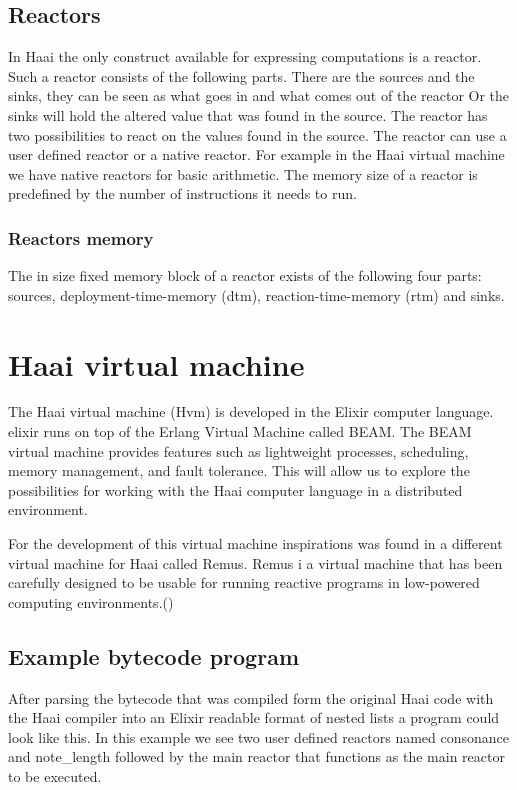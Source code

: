\documentclass[a4paper]{book}
\begin{document}
\section{Reactors}
In Haai the only construct available for expressing computations is a reactor. Such a reactor consists of the following parts. There are the sources and the sinks, they can be seen as what goes in and what comes out of the reactor Or the sinks will hold the altered value that was found in the source. The reactor has two possibilities to react on the values found in the source. The reactor can use a user defined reactor or a native reactor. For example in the Haai virtual machine we have native reactors for basic arithmetic. The memory size of a reactor is predefined by the number of instructions it needs to run. 
\subsection{Reactors memory}
The in size fixed memory block of a reactor exists of the following four parts: sources, deployment-time-memory (dtm), reaction-time-memory (rtm) and sinks.   



\chapter{Haai virtual machine}
The Haai virtual machine (Hvm) is developed in the Elixir computer language. elixir runs on top of the Erlang Virtual Machine called BEAM. The BEAM virtual machine provides features such as lightweight processes, scheduling, memory management, and fault tolerance. This will allow us to explore the possibilities for working with the Haai computer language in a distributed environment.

For the development of this virtual machine inspirations was found in a different virtual machine for Haai called Remus. Remus i a virtual machine that has been carefully designed to be usable for running reactive programs in low-powered computing environments.(\cite{oeyen_remus_2022}) 

\section{Example bytecode program}

After parsing the bytecode that was compiled form the original Haai code with the Haai compiler into an Elixir readable format of nested lists a program could look like this. In this example we see two user defined reactors named consonance and note\_length followed by the main reactor that functions as the main reactor to be executed. 
\end{document}
